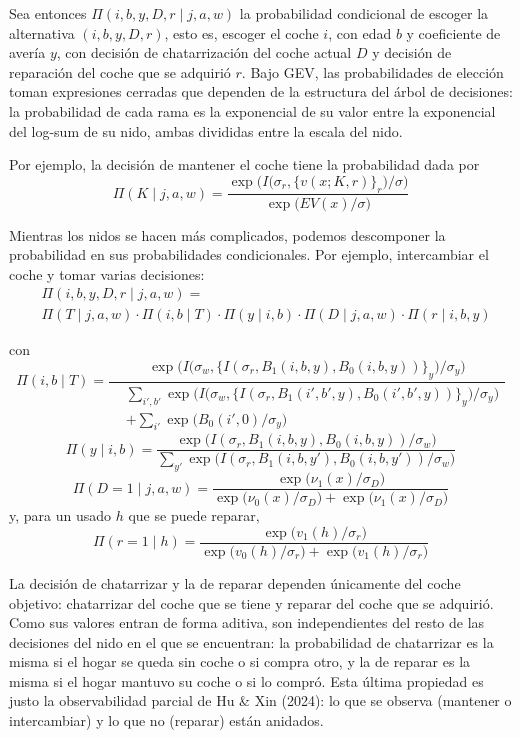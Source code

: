 \documentclass{article}
\begin{document}
Sea entonces $\Pi(i,b,y,D,r\mid j,a,w)$ la probabilidad condicional de escoger la alternativa $(i,b,y,D,r)$, esto es, escoger el coche $i$, con edad $b$ y coeficiente de avería $y$, con decisión de chatarrización del coche actual $D$ y decisión de reparación del coche que se adquirió $r$. Bajo GEV, las probabilidades de elección toman expresiones cerradas que dependen de la estructura del árbol de decisiones: la probabilidad de cada rama es la exponencial de su valor entre la exponencial del log-sum de su nido, ambas divididas entre la escala del nido.

Por ejemplo, la decisión de mantener el coche tiene la probabilidad dada por
\begin{equation}
    \Pi(K\mid j,a,w)=
    \frac{\exp\Big(I\big(\sigma_r,\{v(x;K,r)\}_{r}\big)/\sigma\Big)}{\exp\big(EV(x)/\sigma\big)}
\end{equation}

Mientras los nidos se hacen más complicados, podemos descomponer la probabilidad en sus probabilidades condicionales. Por ejemplo, intercambiar el coche y tomar varias decisiones:
\begin{equation}
    \begin{aligned}
        & \Pi(i,b,y,D,r\mid j,a,w)=\\
        &\Pi(T\mid j,a,w)\cdot \Pi(i,b\mid T)\cdot \Pi(y\mid i,b)\cdot \Pi(D\mid j,a,w)\cdot \Pi(r\mid i,b,y)
    \end{aligned}
\end{equation}

con
$$\Pi(i,b\mid T)=\frac{\exp\Big(I\big(\sigma_w,\{I(\sigma_r,B_1(i,b,y),B_0(i,b,y))\}_{y}\big)/\sigma_y\Big)}{\begin{aligned}&\textstyle\sum_{i',b'}\exp\Big(I\big(\sigma_w,\{I(\sigma_r,B_1(i',b',y),B_0(i',b',y))\}_{y}\big)/\sigma_y\Big)\\&\textstyle+\sum_{i'}\exp\big(B_0(i',0)/\sigma_y\big)\end{aligned}}$$
$$\Pi(y\mid i,b)=\frac{\exp\big(I(\sigma_r,B_1(i,b,y),B_0(i,b,y))/\sigma_w\big)}{\sum_{y'}\exp\big(I(\sigma_r,B_1(i,b,y'),B_0(i,b,y'))/\sigma_w\big)}$$
$$\Pi(D=1\mid j,a,w)=\frac{\exp\big(\nu_1(x)/\sigma_D\big)}{\exp\big(\nu_0(x)/\sigma_D\big)+\exp\big(\nu_1(x)/\sigma_D\big)}$$
y, para un usado $h$ que se puede reparar,
$$\Pi(r=1\mid h)=\frac{\exp\big(v_1(h)/\sigma_r\big)}{\exp\big(v_0(h)/\sigma_r\big)+\exp\big(v_1(h)/\sigma_r\big)}$$


La decisión de chatarrizar y la de reparar dependen únicamente del coche objetivo: chatarrizar del coche que se tiene y reparar del coche que se adquirió. Como sus valores entran de forma aditiva, son independientes del resto de las decisiones del nido en el que se encuentran: la probabilidad de chatarrizar es la misma si el hogar se queda sin coche o si compra otro, y la de reparar es la misma si el hogar mantuvo su coche o si lo compró. Esta última propiedad es justo la observabilidad parcial de Hu \& Xin (2024): lo que se observa (mantener o intercambiar) y lo que no (reparar) están anidados.
\end{document}

